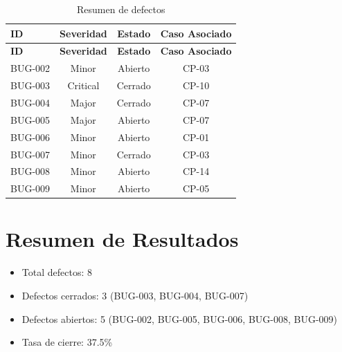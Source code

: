 \begin{longtable}{lccc}
\caption{Resumen de defectos}
\label{tab:resumen-defectos}\\
\toprule
\textbf{ID} & \textbf{Severidad} & \textbf{Estado} & \textbf{Caso Asociado}\\
\midrule
\endfirsthead
\toprule
\textbf{ID} & \textbf{Severidad} & \textbf{Estado} & \textbf{Caso Asociado}\\
\midrule
\endhead
\bottomrule
\endfoot

BUG-002 & Minor & Abierto & CP-03\\

BUG-003 & Critical & Cerrado & CP-10\\

BUG-004 & Major & Cerrado & CP-07\\

BUG-005 & Major & Abierto & CP-07\\

BUG-006 & Minor & Abierto & CP-01\\

BUG-007 & Minor & Cerrado & CP-03\\

BUG-008 & Minor & Abierto & CP-14\\

BUG-009 & Minor & Abierto & CP-05\\

\end{longtable}

\section{Resumen de Resultados}
\label{sec:resumen-resultados}

\begin{itemize}
    \item Total defectos: 8
    \item Defectos cerrados: 3 (BUG-003, BUG-004, BUG-007)
    \item Defectos abiertos: 5 (BUG-002, BUG-005, BUG-006, BUG-008, BUG-009)
    \item Tasa de cierre: 37.5\%
\end{itemize}
